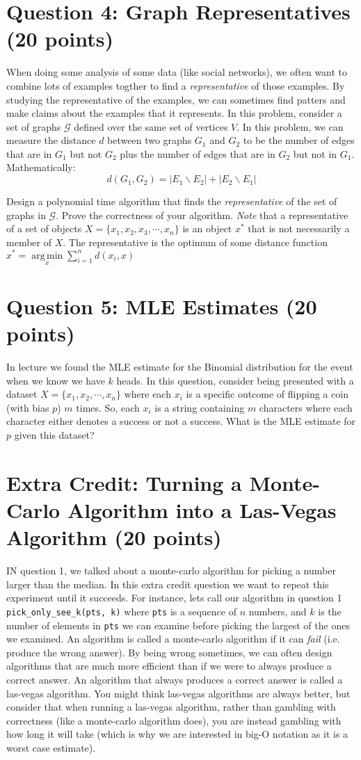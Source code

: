 \documentclass[11pt]{article}
\newcommand{\question}[1]{\section*{\normalsize #1}}
\DeclareMathOperator*{\argmin}{arg\,min}
\begin{document}
\question{Question 4: Graph Representatives (20 points)}
When doing some analysis of some data (like social networks), we often want to combine lots of examples togther to find a \textit{representative} of those examples. By studying the representative of the examples, we can sometimes find patters and make claims about the examples that it represents. In this problem, consider a set of graphs $\mathcal{G}$ defined over the same set of vertices $V$. In this problem, we can measure the distance $d$ between two graphs $G_1$ and $G_2$ to be the number of edges that are in $G_1$ but not $G_2$ plus the number of edges that are in $G_2$ but not in $G_1$. Mathematically:
$$d(G_1, G_2) = |E_1 \backslash E_2| + |E_2 \backslash E_1|$$

\noindent Design a polynomial time algorithm that finds the \textit{representative} of the set of graphs in $\mathcal{G}$. Prove the correctness of your algorithm. \textit{Note} that a representative of a set of objects $X = \{x_1, x_2, x_3, \cdots, x_n\}$ is an object $x^*$ that is not necessarily a member of $X$. The representative is the optimum of some distance function $x^* = \argmin\limits_{x}\sum\limits_{i=1}^n d(x_i, x)$\newpage


\question{Question 5: MLE Estimates (20 points)}
In lecture we found the MLE estimate for the Binomial distribution for the event when we know we have $k$ heads. In this question, consider being presented with a dataset $X = \{x_1, x_2, \cdots, x_n\}$ where each $x_i$ is a specific outcome of flipping a coin (with bias $p$) $m$ times. So, each $x_i$ is a string containing $m$ characters where each character either denotes a success or not a success. What is the MLE estimate for $p$ given this dataset?\newpage


\question{Extra Credit: Turning a Monte-Carlo Algorithm into a Las-Vegas Algorithm (20 points)}
IN question 1, we talked about a monte-carlo algorithm for picking a number larger than the median. In this extra credit question we want to repeat this experiment until it succeeds. For instance, lets call our algorithm in question 1 \texttt{pick\_only\_see\_k(pts, k)} where \texttt{pts} is a sequence of $n$ numbers, and $k$ is the number of elements in \texttt{pts} we can examine before picking the largest of the ones we examined. An algorithm is called a monte-carlo algorithm if it can \textit{fail} (i.e. produce the wrong answer). By being wrong sometimes, we can often design algorithms that are much more efficient than if we were to always produce a correct answer. An algorithm that always produces a correct answer is called a las-vegas algorithm. You might think las-vegas algorithms are always better, but consider that when running a las-vegas algorithm, rather than gambling with correctness (like a monte-carlo algorithm does), you are instead gambling with how long it will take (which is why we are interested in big-O notation as it is a worst case estimate).
\end{document}
